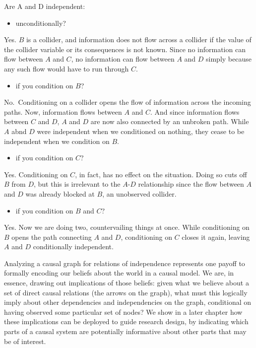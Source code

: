 \documentclass[12pt,]{book}
\providecommand{\tightlist}{%
  \setlength{\itemsep}{0pt}\setlength{\parskip}{0pt}}
\begin{document}
Are A and D independent:

\begin{itemize}
\tightlist
\item
  unconditionally?
\end{itemize}

Yes. \(B\) is a collider, and information does not flow across a collider if the value of the collider variable or its consequences is not known. Since no information can flow between \(A\) and \(C\), no information can flow between \(A\) and \(D\) simply because any such flow would have to run through \(C\).

\begin{itemize}
\tightlist
\item
  if you condition on \(B\)?
\end{itemize}

No.~Conditioning on a collider opens the flow of information across the incoming paths. Now, information flows between \(A\) and \(C\). And since information flows between \(C\) and \(D\), \(A\) and \(D\) are now also connected by an unbroken path. While \(A\) abnd \(D\) were independent when we conditioned on nothing, they cease to be independent when we condition on \(B\).

\begin{itemize}
\tightlist
\item
  if you condition on \(C\)?
\end{itemize}

Yes. Conditioning on \(C\), in fact, has no effect on the situation. Doing so cuts off \(B\) from \(D\), but this is irrelevant to the \(A\)-\(D\) relationship since the flow between \(A\) and \(D\) was already blocked at \(B\), an unobserved collider.

\begin{itemize}
\tightlist
\item
  if you condition on \(B\) and \(C\)?
\end{itemize}

Yes. Now we are doing two, countervailing things at once. While conditioning on \(B\) opens the path connecting \(A\) and \(D\), conditioning on \(C\) closes it again, leaving \(A\) and \(D\) conditionally independent.

Analyzing a causal graph for relations of independence represents one payoff to formally encoding our beliefs about the world in a causal model. We are, in essence, drawing out implications of those beliefs: given what we believe about a set of direct causal relations (the arrows on the graph), what must this logically imply about other dependencies and independencies on the graph, conditional on having observed some particular set of nodes? We show in a later chapter how these implications can be deployed to guide research design, by indicating which parts of a causal system are potentially informative about other parts that may be of interest.
\end{document}
